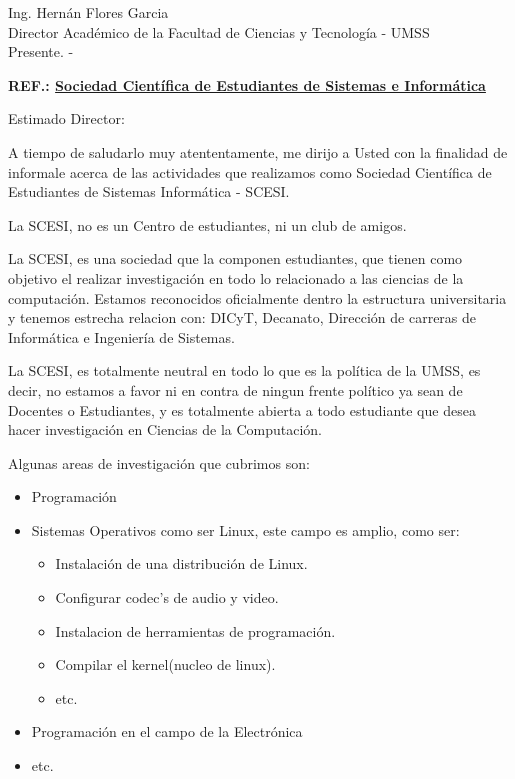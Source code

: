 \documentclass[a4paper,12pt]{letter}
\begin{document}
\begin{letter}{Ing. Hern\'an Flores Garcia\\ Director Acad\'emico de la Facultad de Ciencias y Tecnolog\'ia - UMSS \\ Presente. -}

\begin{center}
	\opening{\textbf{REF.: \underline{Sociedad Cient\'ifica de Estudiantes de Sistemas e Inform\'atica}}}
\end{center}

Estimado Director:

A tiempo de saludarlo muy atententamente, me dirijo a Usted con la finalidad de informale acerca de las 
actividades que realizamos como Sociedad Cient\'ifica de Estudiantes de Sistemas Inform\'atica - SCESI.

La SCESI, no es un Centro de estudiantes, ni un club de amigos.

La SCESI, es una sociedad que la componen estudiantes, que tienen como objetivo el realizar investigaci\'on en
todo lo relacionado a las ciencias de la computaci\'on. Estamos reconocidos oficialmente dentro la estructura 
universitaria y tenemos estrecha relacion con: DICyT, Decanato, Direcci\'on de carreras de Inform\'atica e 
Ingenier\'ia de Sistemas.

La SCESI, es totalmente neutral en todo lo que es la pol\'itica de la UMSS, es decir, no estamos a favor ni en 
contra de ningun frente pol\'itico ya sean de Docentes o Estudiantes, y es totalmente abierta a todo estudiante 
que desea hacer investigaci\'on en Ciencias de la Computaci\'on.

Algunas areas de investigaci\'on que cubrimos son:

\begin{itemize}
    \item Programaci\'on
    \item Sistemas Operativos como ser Linux, este campo es amplio, como ser:
    \begin{itemize}
        \item Instalaci\'on de una distribuci\'on de Linux.
        \item Configurar codec's de audio y video.
        \item Instalacion de herramientas de programaci\'on.
        \item Compilar el kernel(nucleo de linux).
        \item etc.
    \end{itemize}
    \item Programaci\'on en el campo de la Electr\'onica
    \item etc.
\end{itemize}


\end{letter}
\end{document}
